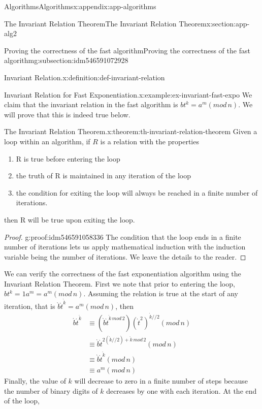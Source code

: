 \documentclass[oneside,10pt,]{book}
\numberwithin{equation}{section}
\begin{document}
\begin{appendixptx}{Algorithms}{}{Algorithms}{}{}{x:appendix:app-algorithms}
\begin{sectionptx}{The Invariant Relation Theorem}{}{The Invariant Relation Theorem}{}{}{x:section:app-alg2}
\begin{subsectionptx}{Proving the correctness of the fast algorithm}{}{Proving the correctness of the fast algorithm}{}{}{g:subsection:idm546591072928}
\begin{definition}{Invariant Relation.}{x:definition:def-invariant-relation}
\end{definition}
\begin{example}{Invariant Relation for Fast Exponentiation.}{x:example:ex-invariant-fast-expo}%
We claim that the invariant relation in the fast algorithm is \(b t^k = a^m (mod\,n)\).  We will prove that this is indeed true below.%
\end{example}
\begin{theorem}{The Invariant Relation Theorem.}{}{x:theorem:th-invariant-relation-theorem}%
Given a loop within an algorithm, if \(R\) is a relation with the properties%
\par
%
\begin{enumerate}[label=(\alph*)]
\item{}R is true before entering the loop%
\item{}the truth of R is maintained in any iteration of the loop%
\item{}the condition for exiting the loop will always be reached in a finite number of iterations.%
\end{enumerate}
%
\par
then R will be true upon exiting the loop.%
\end{theorem}
\begin{proof}{}{g:proof:idm546591058336}
The condition that the loop ends in a finite number of iterations lets us apply mathematical induction with the induction variable being the number of iterations.  We leave the details to the reader.%
\end{proof}
We can verify the correctness of the fast exponentiation algorithm using the Invariant Relation Theorem.  First we note that prior to entering the loop,  \(b t^k = 1 a^m = a^m (mod\,n)\).  Assuming the relation is true at the start of any iteration, that is \(\grave{b} \grave{t}^{\grave k} = a^m (mod\,n)\), then%
\begin{equation*}
\begin{split}
\acute{b} \acute{t}^{\acute{k}} & \equiv (\grave{b} \grave{t}^{\grave{k}\,mod\,2})(\grave t^2)^{ \grave k//2}(mod\,n)\\
& \equiv\grave{b} \grave{t}^{2(\grave{k}//2) +\grave{k}\,mod\,2 }(mod\,n) \\
& \equiv \grave{b} \grave{t}^{\grave{k}}(mod\,n)\\
& \equiv  a^m (mod\,n)
\end{split}
\end{equation*}
Finally, the value of \(k\) will decrease to zero in a finite number of steps because the number of binary digits of \(k\) decreases by one with each iteration.  At the end of the loop,%

\end{subsectionptx}
\end{sectionptx}
\end{appendixptx}
\end{document}
